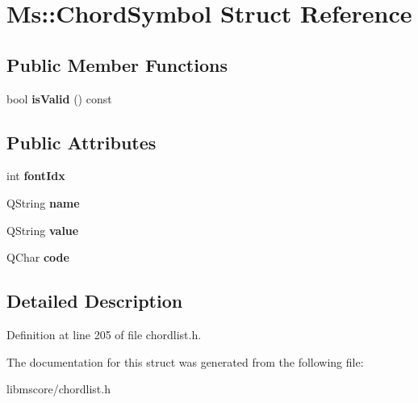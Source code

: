 \hypertarget{struct_ms_1_1_chord_symbol}{}\section{Ms\+:\+:Chord\+Symbol Struct Reference}
\label{struct_ms_1_1_chord_symbol}
\subsection*{Public Member Functions}
\begin{DoxyCompactItemize}
\item 
\mbox{\label{struct_ms_1_1_chord_symbol_a26a7c32bf41191f13c5a1083017da2a0}} 
bool {\bfseries is\+Valid} () const
\end{DoxyCompactItemize}
\subsection*{Public Attributes}
\begin{DoxyCompactItemize}
\item 
\mbox{\label{struct_ms_1_1_chord_symbol_a9f28852b4ada6d19dd82620c61ac5525}} 
int {\bfseries font\+Idx}
\item 
\mbox{\label{struct_ms_1_1_chord_symbol_a56d078d39d6a4f9e77930b17d64f5971}} 
Q\+String {\bfseries name}
\item 
\mbox{\label{struct_ms_1_1_chord_symbol_a502afbc153780db70673de103f06e99a}} 
Q\+String {\bfseries value}
\item 
\mbox{\label{struct_ms_1_1_chord_symbol_a3cc7cd485ecb879d9c5cd2aae404a728}} 
Q\+Char {\bfseries code}
\end{DoxyCompactItemize}


\subsection{Detailed Description}


Definition at line 205 of file chordlist.\+h.



The documentation for this struct was generated from the following file\+:\begin{DoxyCompactItemize}
\item 
libmscore/chordlist.\+h\end{DoxyCompactItemize}
